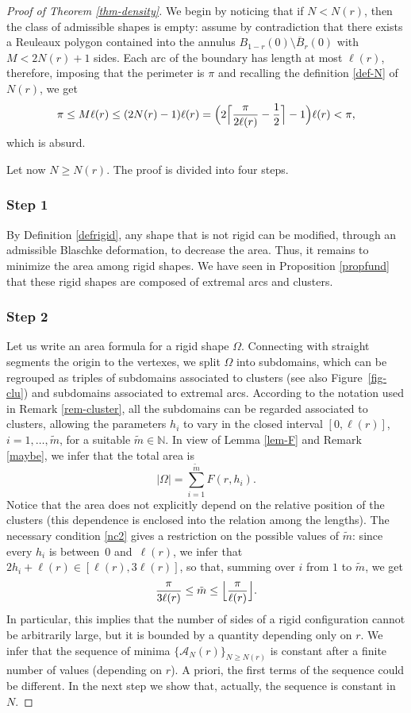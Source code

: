 \documentclass[JEP,XML,SOM,Unicode,NoFloatCountersInSection]{cedram}
\let\mathcal\mathscr
\theoremstyle{plain}
\theoremstyle{definition}
\newcommand\A{\mathcal A}
\begin{document}
\begin{proof}[Proof of Theorem \ref{thm-density}] We begin by noticing that if $N<N(r)$, then the class of admissible shapes is empty: assume by contradiction that there exists a Reuleaux polygon contained into the annulus $B_{1-r}(0)\setminus \overline{B}_r(0)$ with $M<2N(r)+1$ sides. Each arc of the boundary has length at most $\ell(r)$, therefore, imposing that the perimeter is $\pi$ and recalling the definition \eqref{def-N} of $N(r)$, we get
\[
\pi \leq M \ell(r) \leq (2N(r)-1) \ell(r)= \Bigl(2 \Bigl \lceil\frac{\pi}{2\ell(r)}-\frac12 \Bigr \rceil-1 \Bigr) \ell(r) < \pi,
\]
which is absurd.

Let now $N\geq N(r)$. The proof is divided into four steps.

\subsubsection*{Step 1} By Definition \ref{defrigid}, any shape that is not rigid can be modified, through an admissible
Blaschke deformation, to decrease the area. Thus, it remains to minimize the area
among rigid shapes. We have seen in Proposition \ref{propfund} that these rigid shapes
are composed of extremal arcs and clusters.

\subsubsection*{Step 2} Let us write an area formula for a rigid shape $\Omega$. Connecting with straight segments the origin to the vertexes, we split $\Omega$ into subdomains, which can be regrouped as triples of subdomains associated to clusters {(see also Figure~\ref{fig-clu})} and subdomains associated to extremal arcs. According to the notation used in Remark \ref{rem-cluster}, all the subdomains can be regarded associated to clusters, allowing the parameters $h_i$ to vary in the closed interval $[0,\ell(r)]$, $i=1, \ldots, \tilde{m}$, for a suitable $\tilde{m}\in \mathbb N$. In view of Lemma \ref{lem-F} and Remark \ref{maybe}, we infer that the total area is
\[
|\Omega|=\sum_{i=1}^{\tilde{m}}F(r, h_i).
\]
Notice that the area does not explicitly depend on the relative position of the clusters (this dependence is enclosed into the relation among the lengths).
The necessary condition \eqref{nc2} gives a restriction on the possible values of $\tilde{m}$: since every $h_i$ is between~$0$ and~$\ell(r)$, we infer that $2h_i + \ell(r) \in [\ell(r), 3 \ell(r)]$, so that, summing over $i$ from $1$ to $\tilde{m}$, we get
\begin{equation}\label{range}
\frac{\pi}{3\ell(r)}\leq \tilde{m} \leq \Bigl \lfloor\frac{\pi}{\ell(r)}\Bigr \rfloor.
\end{equation}
In particular, this implies that the number of sides of a rigid configuration cannot be arbitrarily large, but it is bounded by a quantity depending only on $r$. We infer that the sequence of minima $\{\A_N(r)\}_{N\geq N(r)}$ is constant after a finite number of values (depending on $r$). A priori, the first terms of the sequence could be different. In the next step we show that, actually, the sequence is constant in $N$.


\end{proof}
\end{document}
